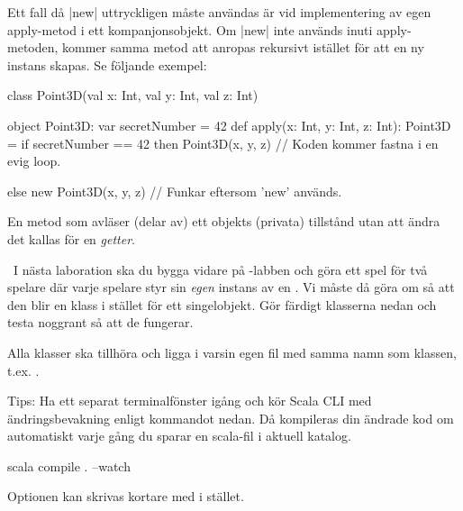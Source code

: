 Ett fall då \code|new| uttryckligen måste användas är vid implementering av egen apply-metod i ett kompanjonsobjekt. Om \code|new| inte används inuti apply-metoden, kommer samma metod att anropas rekursivt istället för att en ny instans skapas. Se följande exempel:

\begin{Code}
class Point3D(val x: Int, val y: Int, val z: Int)

object Point3D:
  var secretNumber = 42
  def apply(x: Int, y: Int, z: Int): Point3D =
    if secretNumber == 42 then
      Point3D(x, y, z) // Koden kommer fastna i en evig loop.

    else new Point3D(x, y, z) // Funkar eftersom 'new' används.
\end{Code}



\SubtaskSolved En metod som avläser (delar av) ett objekts (privata) tillstånd utan att ändra det kallas för en \emph{getter}.

\QUESTEND



\QUESTBEGIN

\Task\label{exe:classes:labprep}  \what~I nästa laboration ska du bygga vidare på -labben och göra ett spel för två spelare där varje spelare styr sin \emph{egen} instans av en . Vi måste då göra om  så att den blir en klass i stället för ett singelobjekt. Gör färdigt klasserna nedan och testa noggrant så att de fungerar. 

Alla klasser ska tillhöra  och ligga i varsin egen fil med samma namn som klassen, t.ex. . 

Tips: Ha ett separat terminalfönster igång och kör Scala CLI med ändringsbevakning enligt kommandot nedan. Då kompileras din ändrade kod om automatiskt varje gång du sparar en scala-fil i aktuell katalog.
\begin{REPLnonum}
scala compile . --watch
\end{REPLnonum}
Optionen  kan skrivas kortare med  i stället.

